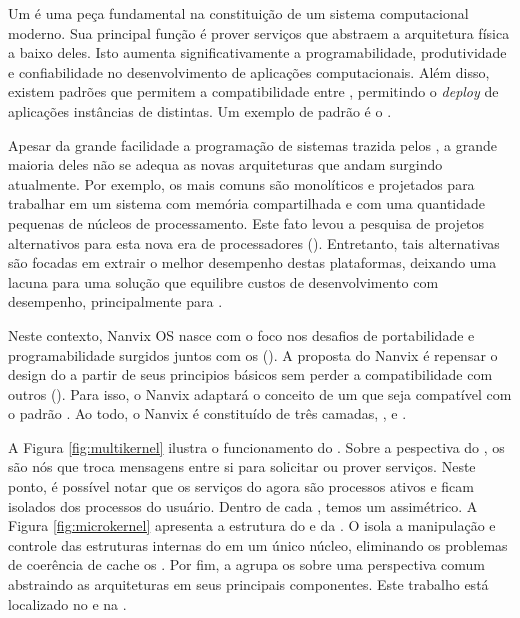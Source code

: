 	Um \os é uma peça fundamental na constituição de um sistema computacional
	moderno. Sua principal função é prover serviços que abstraem a arquitetura
	física a baixo deles. Isto aumenta significativamente a programabilidade,
	produtividade e confiabilidade no desenvolvimento de aplicações
	computacionais. Além disso, existem padrões que permitem a compatibilidade
	entre \oses, permitindo o \textit{deploy} de aplicações instâncias de \oses
	distintas. Um exemplo de padrão é o \posix.

	Apesar da grande facilidade a programação de sistemas trazida pelos \oses,
	a grande maioria deles não se adequa as novas arquiteturas que andam
	surgindo atualmente. Por exemplo, os \oses mais comuns são monolíticos
	e projetados para trabalhar em um sistema com memória compartilhada e com
	uma quantidade pequenas de núcleos de processamento. Este fato levou
	a pesquisa de projetos alternativos para esta nova era de processadores
	(\cite{abc}). Entretanto, tais alternativas são focadas em extrair o melhor
	desempenho destas plataformas, deixando uma lacuna para uma solução que
	equilibre custos de desenvolvimento com desempenho, principalmente para
	\lws.

	Neste contexto, Nanvix OS nasce com o foco nos desafios de portabilidade
	e programabilidade surgidos juntos com os \lws (\cite{CHRISTGAU, ABC}).
	A proposta do Nanvix é repensar o design do \os a partir de seus principios
	básicos sem perder a compatibilidade com outros \oses (\cite{PENNA, ABC}).
	Para isso, o Nanvix adaptará o conceito de um \multikernel que seja
	compatível com o padrão \posix. Ao todo, o Nanvix é constituído de três
	camadas, \multikernel, \microkernel e \hal.

	A Figura \ref{fig:multikernel} ilustra o funcionamento do
	\multikernel. Sobre a pespectiva do \os, os \clusters são
	nós que troca mensagens entre si para solicitar ou prover serviços. Neste
	ponto, é possível notar que os serviços do \os agora são processos ativos
	e ficam isolados dos processos do usuário.
	Dentro de cada \cluster, temos um \microkernel assimétrico. A Figura
	\ref{fig:microkernel} apresenta a estrutura do \microkernel e da \hal.
	O \microkernel isola a manipulação e controle das estruturas internas do
	 em um único núcleo, eliminando os problemas de coerência de
	cache os \lws. Por fim, a \hal agrupa os \lws sobre uma perspectiva comum
	abstraindo as arquiteturas em seus principais componentes.
	Este trabalho está localizado no \microkernel e na \hal.

